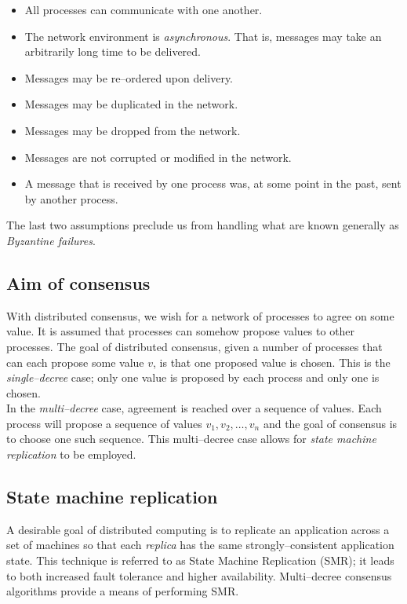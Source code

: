 \begin{itemize}
  \item All processes can communicate with one another.
  \item The network environment is \emph{asynchronous}. That is, messages may take an arbitrarily long time to be delivered.
  \item Messages may be re--ordered upon delivery.
  \item Messages may be duplicated in the network.
  \item Messages may be dropped from the network.
  \item Messages are not corrupted or modified in the network.
  \item A message that is received by one process was, at some point in the past, sent by another process.
\end{itemize}

The last two assumptions preclude us from handling what are known generally as \emph{Byzantine failures}.


\subsection{Aim of consensus}

With distributed consensus, we wish for a network of processes to agree on some value. It is assumed that processes can somehow propose values to other processes. The goal of distributed consensus, given a number of processes that can each propose some value $v$, is that one proposed value is chosen. This is the \emph{single--decree} case; only one value is proposed by each process and only one is chosen. \\

In the \emph{multi--decree} case, agreement is reached over a sequence of values. Each process will propose a sequence of values $v_1, v_2, \ldots, v_n$ and the goal of consensus is to choose one such sequence. This multi--decree case allows for \emph{state machine replication} to be employed.



\subsection{State machine replication}

A desirable goal of distributed computing is to replicate an application across a set of machines so that each \emph{replica} has the same strongly--consistent application state. This technique is referred to as State Machine Replication (SMR); it leads to both increased fault tolerance and higher availability. Multi--decree consensus algorithms provide a means of performing SMR. \\

